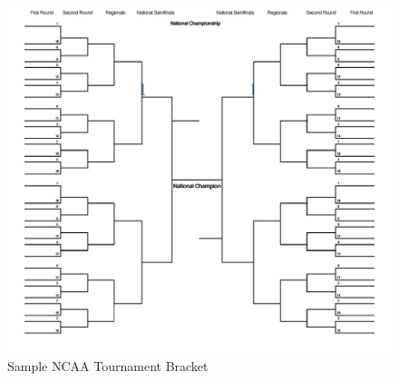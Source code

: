 \documentclass[conference]{IEEEtran}
\begin{document}
{\begin{figure}[H]
\centering
	\includegraphics[scale=.28]{bracket_blank.pdf}%
	\caption{Sample NCAA Tournament Bracket \cite{Andy-Soltis}}
	\label{bracket}
\end{figure}

}
\end{document}
